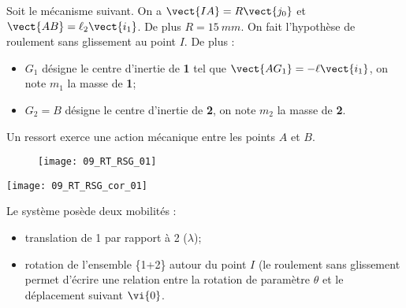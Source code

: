 \normalfalse \difficiletrue \tdifficilefalse
\correctiontrue

\setcounter{question}{0}%
\ifcorrection
\else
{}
\fi

\ifprof
\else
Soit le mécanisme suivant. On a $\vect{IA}=R\vect{j_0}$ et $\vect{AB}=\ell_2\vect{i_1}$. De plus $R=\SI{15}{mm}$.
On fait l'hypothèse de roulement sans glissement au point $I$. De plus :
\begin{itemize}
\item $G_1$ désigne le centre d'inertie de \textbf{1} tel que $\vect{AG_1}=-\ell\vect{i_1}$, on note $m_1$ la masse de \textbf{1};%
\item $G_2=B$ désigne le centre d'inertie de \textbf{2}, on note $m_2$ la masse de \textbf{2}.%
\end{itemize}
Un ressort exerce une action mécanique entre les points $A$ et $B$. 
\begin{figure}[!h]
\centering
\texttt{[image: 09\_RT\_RSG\_01]}
\end{figure}
\fi

\ifprof
\begin{marginfigure}
\texttt{[image: 09\_RT\_RSG\_cor\_01]}
\end{marginfigure}

\else
\fi

\ifprof
Le système posède deux mobilités : 
\begin{itemize}
\item translation de 1 par rapport à 2 ($\lambda$);
\item rotation de l'ensemble \{1+2\} autour du point $I$ (le roulement sans glissement permet d'écrire une relation entre la rotation de paramètre $\theta$ et le déplacement suivant $\vi{0}$.
\end{itemize}

